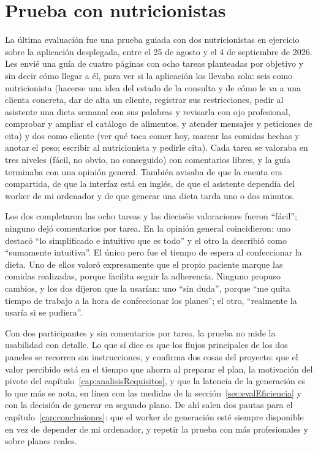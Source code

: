 \section{Prueba con nutricionistas}
\label{sec:evalUsuarios}

La última evaluación fue una prueba guiada con dos nutricionistas en ejercicio sobre la aplicación desplegada, entre el 25 de agosto y el 4 de septiembre de 2026. Les envié una guía de cuatro páginas con ocho tareas planteadas por objetivo y sin decir cómo llegar a él, para ver si la aplicación los llevaba sola: seis como nutricionista (hacerse una idea del estado de la consulta y de cómo le va a una clienta concreta, dar de alta un cliente, registrar sus restricciones, pedir al asistente una dieta semanal con sus palabras y revisarla con ojo profesional, comprobar y ampliar el catálogo de alimentos, y atender mensajes y peticiones de cita) y dos como cliente (ver qué toca comer hoy, marcar las comidas hechas y anotar el peso; escribir al nutricionista y pedirle cita). Cada tarea se valoraba en tres niveles (fácil, no obvio, no conseguido) con comentarios libres, y la guía terminaba con una opinión general. También avisaba de que la cuenta era compartida, de que la interfaz está en inglés, de que el asistente dependía del worker de mi ordenador y de que generar una dieta tarda uno o dos minutos.

Los dos completaron las ocho tareas y las dieciséis valoraciones fueron ``fácil''; ninguno dejó comentarios por tarea. En la opinión general coincidieron: uno destacó ``lo simplificado e intuitivo que es todo'' y el otro la describió como ``sumamente intuitiva''. El único pero fue el tiempo de espera al confeccionar la dieta. Uno de ellos valoró expresamente que el propio paciente marque las comidas realizadas, porque facilita seguir la adherencia. Ninguno propuso cambios, y los dos dijeron que la usarían: uno ``sin duda'', porque ``me quita tiempo de trabajo a la hora de confeccionar los planes''; el otro, ``realmente la usaría si se pudiera''.

Con dos participantes y sin comentarios por tarea, la prueba no mide la usabilidad con detalle. Lo que sí dice es que los flujos principales de los dos paneles se recorren sin instrucciones, y confirma dos cosas del proyecto: que el valor percibido está en el tiempo que ahorra al preparar el plan, la motivación del pivote del capítulo~\ref{cap:analisisRequisitos}, y que la latencia de la generación es lo que más se nota, en línea con las medidas de la sección~\ref{sec:evalEficiencia} y con la decisión de generar en segundo plano. De ahí salen dos pautas para el capítulo~\ref{cap:conclusiones}: que el worker de generación esté siempre disponible en vez de depender de mi ordenador, y repetir la prueba con más profesionales y sobre planes reales.
